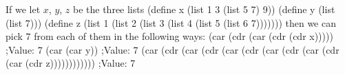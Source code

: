 If we let $x$, $y$, $z$ be the three lists
\begtt\scm
(define x (list 1 3 (list 5 7) 9))
(define y (list (list 7)))
(define z (list 1 (list 2 (list 3 (list 4 (list 5 (list 6 7)))))))
\endtt
then we can pick $7$ from each of them in the following ways:
\begtt\scm
(car (cdr (car (cdr (cdr x)))))
;Value: 7
(car (car y))
;Value: 7
(car (cdr (car (cdr (car (cdr (car (cdr (car (cdr (car (cdr z))))))))))))
;Value: 7
\endtt
